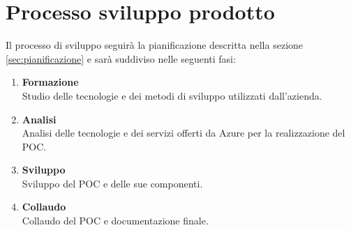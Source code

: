 \section{Processo sviluppo prodotto}
Il processo di sviluppo seguirà la pianificazione descritta nella sezione \ref{sec:pianificazione} e sarà suddiviso nelle seguenti fasi:
\begin{enumerate}
    \item \textbf{Formazione} \\
    Studio delle tecnologie e dei metodi di sviluppo utilizzati dall'azienda.
    \item \textbf{Analisi} \\
    Analisi delle tecnologie e dei servizi offerti da Azure per la realizzazione del POC.
    \item \textbf{Sviluppo} \\
    Sviluppo del POC e delle sue componenti.
    \item \textbf{Collaudo} \\
    Collaudo del POC e documentazione finale.
\end{enumerate}
